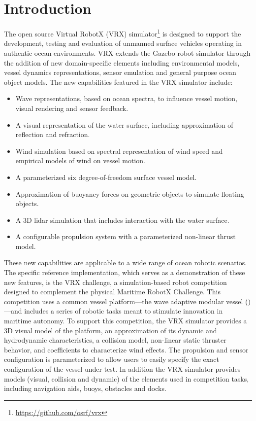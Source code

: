 \documentclass[utf8]{frontiersSCNS} %
\begin{document}
\section{Introduction}
The open source Virtual RobotX (VRX) simulator\footnote{\url{https://github.com/osrf/vrx}} is designed to support the development, testing and evaluation of unmanned surface vehicles operating in authentic ocean environments. VRX extends the Gazebo robot simulator through the addition of new domain-specific elements including environmental models, vessel dynamics representations, sensor emulation and general purpose ocean object models. The new capabilities featured in the VRX simulator include:
\begin{itemize}
\item Wave representations, based on ocean spectra, to influence vessel motion, visual rendering and sensor feedback.
\item A visual representation of the water surface, including approximation of reflection and refraction.
\item Wind simulation based on spectral representation of wind speed and empirical models of wind on vessel motion.
\item A parameterized six degree-of-freedom surface vessel model.
\item Approximation of buoyancy forces on geometric objects to simulate floating objects.
\item A 3D lidar simulation that includes interaction with the water surface.
\item A configurable propulsion system with a parameterized non-linear thrust model.
\end{itemize}

These new capabilities are applicable to a wide range of ocean robotic scenarios. The specific reference implementation, which serves as a demonstration of these new features, is the VRX challenge, a simulation-based robot competition designed to complement the physical Maritime RobotX Challenge. This competition uses a common vessel platform---the wave adaptive modular vessel (\wamv{})---and includes a series of robotic tasks meant to stimulate innovation in maritime autonomy. To support this competition, the VRX simulator provides a 3D visual model of the \wamv{} platform, an approximation of its dynamic and hydrodynamic characteristics, a collision model, non-linear static thruster behavior, and coefficients to characterize wind effects. The propulsion and sensor configuration is parameterized to allow users to easily specify the exact configuration of the vessel under test. In addition the VRX simulator provides models (visual, collision and dynamic) of the elements used in competition tasks, including navigation aids, buoys, obstacles and docks. 
\end{document}

